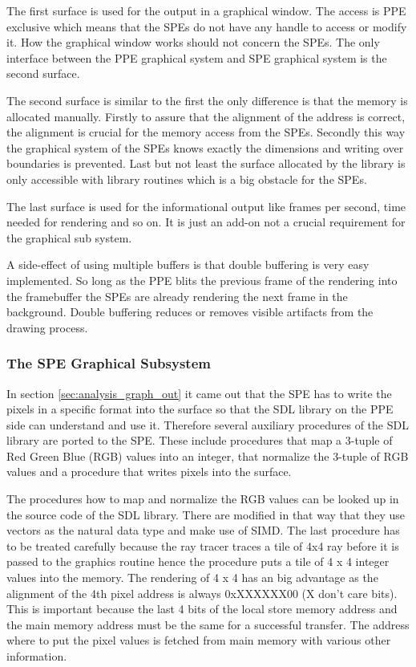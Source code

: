 \documentclass[DIV10, abstracton, openright, footsepline, headsepline, twoside, 9pt,
bigheadings]{scrreprt}
\begin{document}
The first surface is used for the output in a graphical window. The access is PPE
exclusive which means that the SPEs do not have any handle to access or modify it.
How the graphical window works should not concern the SPEs. The only interface
between the PPE graphical system and SPE graphical system is the second surface.

The second surface is similar to the first the only difference is that the
memory is allocated manually. Firstly to assure that the alignment of the address
is correct, the alignment is crucial for the memory access from the SPEs. Secondly
this way the graphical system of the SPEs knows exactly the dimensions and
writing over boundaries is prevented. Last but not least the surface
allocated by the library is only accessible with library routines which is a big
obstacle for the SPEs.

The last surface is used for the informational output like frames per second,
time needed for rendering and so on. It is just an add-on not a crucial
requirement for the graphical sub system.

A side-effect of using multiple buffers is that double buffering is very easy
implemented. So long as the PPE blits the previous frame of the rendering into
the framebuffer the SPEs are already rendering the next frame in the background.
Double buffering reduces or removes visible artifacts from the drawing process.


\subsubsection{The SPE Graphical Subsystem}
\label{sec:design_graph_out_spe}
In section \ref{sec:analysis_graph_out} it came out that the SPE has to write the
pixels in a specific format into the surface so that the SDL library on the PPE
side can understand and use it. Therefore several auxiliary procedures of the
SDL library are ported to the SPE. These include procedures that map a
3-tuple of Red Green Blue (RGB) values into an integer, that normalize the
3-tuple of RGB values and a procedure that writes pixels into the surface.

The procedures how to map and normalize the RGB values can be looked up in the
source code of the SDL library. There are modified in that way that they use
vectors as the natural data type and make use of SIMD. The last procedure
has to be treated carefully because the ray tracer traces a tile of 4x4 ray
before it is passed to the graphics routine hence the procedure puts a tile
of 4 x 4 integer values into the memory. The rendering of 4 x 4 has an big
advantage as the alignment of the 4th pixel address is always 0xXXXXXX00
(X don't care bits). This is important because the last 4 bits of the local store
memory address and the main memory address must be the same for a successful
transfer. The address where to put the pixel values is fetched from main
memory with various other information.
\end{document}

